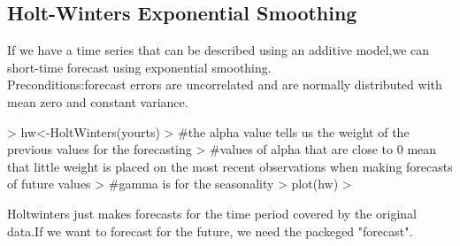 \documentclass[11pt, a4paper]{article} %
\begin{document}
\subsection{Holt-Winters Exponential Smoothing}%

If we have a time series that can be described using an additive model,we can short-time forecast using exponential smoothing.\\
Preconditions:forecast errors are uncorrelated and are normally distributed with mean zero and constant variance.
\begin{Schunk}
\begin{Sinput}
> hw<-HoltWinters(yourts)
> #the alpha value tells us the weight of the previous values for the forecasting
> #values of alpha that are close to 0 mean that little weight is placed on the most recent observations when making forecasts of future values
> #gamma is for the seasonality
> plot(hw)
> 
\end{Sinput}
\end{Schunk}

\noindent Holtwinters just makes forecasts for the time period covered by the original data.If we want to forecast for the future, we need the packeged "forecast".\\
\end{document}
